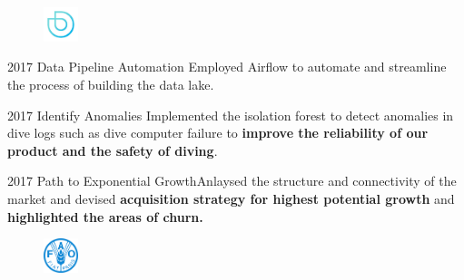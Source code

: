 \documentclass{tccv}
\begin{document}
\begin{figure}[h!] %
  \centering
  \includegraphics[width=1cm,height=1cm]{../company_icon/deepblu.jpg}
\end{figure}

\begin{yearlist}
  \item{2017} {Data Pipeline Automation} {Employed Airflow to automate
    and streamline the process of building the data lake.}

  \item{2017} {Identify Anomalies} {Implemented the isolation forest
    to detect anomalies in dive logs such as dive computer failure to
    \textbf{improve the reliability of our product and the safety of
      diving}.}

  \item{2017} {Path to Exponential Growth}{Anlaysed the structure and
    connectivity of the market and devised \textbf{acquisition
      strategy for highest potential growth} and \textbf{highlighted
      the areas of churn.}}
    
\end{yearlist}


\begin{figure}[h!] %
  \centering
  \includegraphics[width=1cm,height=1cm]{../company_icon/fao.png}
\end{figure}
\end{document}
